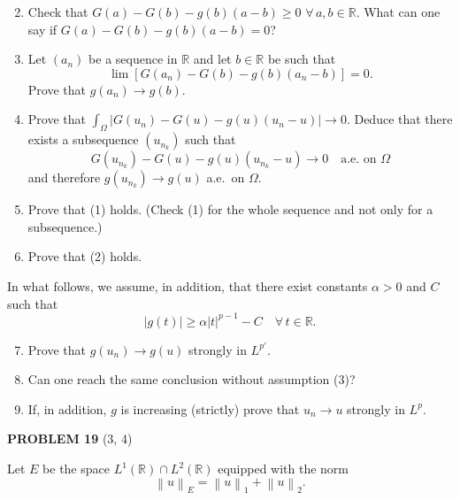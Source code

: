 \documentclass[12pt]{article}
\newcommand{\norm}[1]{\left\|#1\right\|}
\newcommand{\abs}[1]{\left|#1\right|}
\newcommand{\R}{\mathbb{R}}
\begin{document}
\begin{enumerate}
\setcounter{enumi}{1}
\item Check that $G(a) - G(b) - g(b)(a-b) \ge 0$ $\forall\, a, b \in \R$.
What can one say if $G(a) - G(b) - g(b)(a-b) = 0$?
 
\item Let $(a_n)$ be a sequence in $\R$ and let $b \in \R$ be such that
\[
\lim[G(a_n) - G(b) - g(b)(a_n - b)] = 0.
\]
Prove that $g(a_n) \to g(b)$.
 
\item Prove that $\displaystyle\int_\Omega \abs{G(u_n) - G(u) - g(u)(u_n - u)} \to 0$.
Deduce that there exists a subsequence $(u_{n_k})$ such that
\[
G(u_{n_k}) - G(u) - g(u)(u_{n_k} - u) \to 0 \quad \text{a.e. on } \Omega
\]
and therefore $g(u_{n_k}) \to g(u)$ a.e.\ on $\Omega$.
 
\item Prove that (1) holds. (Check (1) for the whole sequence and not only for a subsequence.)
 
\item Prove that (2) holds.
\end{enumerate}
 
\noindent In what follows, we assume, in addition, that there exist constants $\alpha > 0$ and $C$ such that
\begin{equation}\tag{3}
\abs{g(t)} \ge \alpha\abs{t}^{p-1} - C \quad \forall\, t \in \R.
\end{equation}
 
\begin{enumerate}
\setcounter{enumi}{6}
\item Prove that $g(u_n) \to g(u)$ strongly in $L^{p'}$.
 
\item Can one reach the same conclusion without assumption (3)?
 
\item If, in addition, $g$ is increasing (strictly) prove that $u_n \to u$ strongly in $L^p$.
\end{enumerate}
 
\bigskip
 
\noindent\textbf{PROBLEM 19} (3, 4)
 
\medskip
 
Let $E$ be the space $L^1(\R) \cap L^2(\R)$ equipped with the norm
\[
\norm{u}_E = \norm{u}_1 + \norm{u}_2.
\]
 
\end{document}
